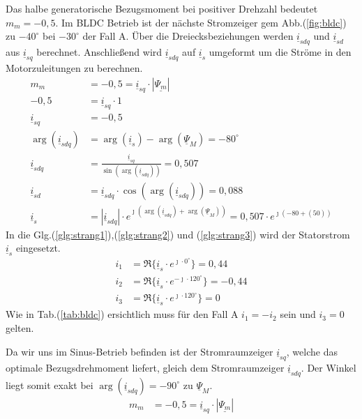 \begin{solution}
\begin{compactenum}
\item Das halbe generatorische Bezugsmoment bei positiver Drehzahl bedeutet $m_m = -0,5$. Im BLDC Betrieb ist der nächste Stromzeiger gem Abb.(\ref{fig:bldc}) zu $-40^\circ$ bei $-30^\circ$ der Fall A. Über die Dreiecksbeziehungen werden $\underline{i}_{sdq}$ und $\underline{i}_{sd}$ aus $\underline{i}_{sq}$ berechnet. Anschließend wird $\underline{i}_{sdq}$ auf $\underline{i}_{s}$ umgeformt um die Ströme in den Motorzuleitungen zu berechnen.
\begin{align}
m_m &= -0,5 = \underline{i}_{sq} \cdot |\underline{\Psi_m}|\\
-0,5 &= \underline{i}_{sq} \cdot 1\\
\underline{i}_{sq} &= -0,5\\
\arg(\underline{i}_{sdq}) &= \arg(\underline{i}_{s}) -\arg(\underline{\Psi}_{M})=-80^\circ\\
\underline{i}_{sdq} &= \frac{\underline{i}_{sq}}{\sin(\arg(\underline{i}_{sdq}))}= 0,507\\
\underline{i}_{sd} &= \underline{i}_{sdq} \cdot \cos(\arg(\underline{i}_{sdq})) = 0,088\\
\underline{i}_{s} &= |\underline{i}_{sdq}| \cdot e^{\jmath (\arg(\underline{i}_{sdq}) + \arg(\underline{\Psi}_{M}))}= 0,507 \cdot e^{\jmath ( -80 + (50))}
\end{align}
In die Glg.(\ref{glg:strang1}),(\ref{glg:strang2}) und (\ref{glg:strang3}) wird der Statorstrom $\underline{i}_s$ eingesetzt.
\begin{align}
i_1 & = \Re \{ \underline{i}_s \cdot e^{\jmath \cdot 0 ^\circ} \} = 0,44\\
i_2 & = \Re \{ \underline{i}_s \cdot e^{-\jmath \cdot 120 ^\circ} \} = -0,44 \\
i_3 & = \Re \{ \underline{i}_s \cdot e^{\jmath \cdot 120 ^\circ} \}=  0
\end{align}
Wie in Tab.(\ref{tab:bldc}) ersichtlich muss für den Fall A $i_1= -i_2$ sein und $i_3= 0$ gelten.
\item Da wir uns im Sinus-Betrieb befinden ist der Stromraumzeiger $\underline{i}_{sq}$, welche das optimale Bezugsdrehmoment liefert, gleich dem Stromraumzeiger $\underline{i}_{sdq}$. Der Winkel liegt somit exakt bei $\arg(\underline{i}_{sdq})=-90^\circ$ zu $\underline{\Psi}_M$.
\begin{align}
m_m &= -0,5 = \underline{i}_{sq} \cdot |\underline{\Psi_m}|\\

\end{align}
\end{compactenum}
\end{solution}

